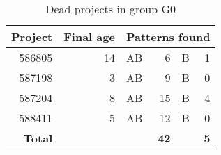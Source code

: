 \begin{table}[H]
\caption{Dead projects in group G0}\label{table:deads_g0}
\centering
\begin{tabular}{rrlrlr}
\hline
	\textbf{Project} & \textbf{Final age} & \multicolumn{4}{l}{\textbf{Patterns
	found}} \\
	\hline
	586805 & 14 & AB & 6 & B & 1 \\
	587198 & 3 & AB & 9 & B & 0 \\
	587204 & 8 & AB & 15 & B & 4 \\
	588411 & 5 & AB & 12 & B & 0 \\
	\hline
	\textbf{Total} & & & \textbf{42} & & \textbf{5} \\
\hline
\end{tabular}
\end{table}